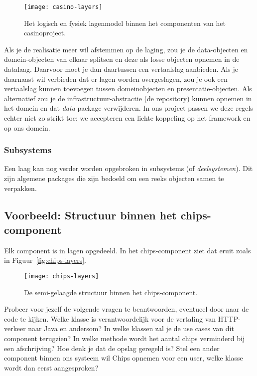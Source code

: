\begin{figure}[H]
    \centering
    \texttt{[image: casino-layers]}
    \caption{Het logisch en fysiek lagenmodel binnen het componenten van het casinoproject.}
    \label{fig:casino-layers}
\end{figure}

Als je de realisatie meer wil afstemmen op de laging, zou je de 
data-objecten en domein-objecten van elkaar splitsen en deze als losse objecten opnemen in de datalaag.
Daarvoor moet je dan daartussen een vertaalslag aanbieden. 
Als je daarnaast wil verbieden dat er lagen worden overgeslagen, 
zou je ook een vertaalslag kunnen toevoegen tussen domeinobjecten en presentatie-objecten.
Als alternatief zou je de infrastructuur-abstractie
(de repository) kunnen opnemen in het domein en dat \textit{data} package verwijderen.
In ons project passen we deze regels echter niet zo strikt toe:
we accepteren een lichte koppeling op het framework en op ons domein.

\subsubsection{Subsystems}
Een laag kan nog verder worden opgebroken in subsystems (of \textit{deelsystemen}).
Dit zijn algemene packages die zijn bedoeld om een reeks objecten samen te verpakken.

\subsection{Voorbeeld: Structuur binnen het chips-component}
Elk component is in lagen opgedeeld. In het chips-component ziet 
dat eruit zoals in Figuur~\ref{fig:chips-layers}.

\begin{figure}[H]
    \centering
    \texttt{[image: chips-layers]}
    \caption{De semi-gelaagde structuur binnen het chips-component.}
    \label{fig:chips-use-cases}
\end{figure}

Probeer voor jezelf de volgende vragen te beantwoorden, eventueel door naar de code te kijken.
Welke klasse is verantwoordelijk voor de vertaling van HTTP-verkeer naar Java en andersom?
In welke klassen zal je de use cases van dit component terugzien?
In welke methode wordt het aantal chips verminderd bij een afschrijving?
Hoe denk je dat de opslag geregeld is?
Stel een ander component binnen ons systeem wil Chips opnemen voor een user, welke klasse wordt dan 
eerst aangesproken?

